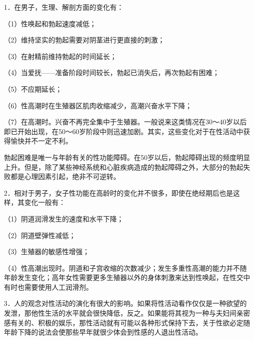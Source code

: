 \documentclass[12pt,UTF8,openany]{ctexbook}
\begin{document}
1．在男子，生理、解剖方面的变化有：

（1）性唤起和勃起速度减低；

（2）维持坚实的勃起需要对阴茎进行更直接的刺激；

（3）在射精前维持勃起的时间延长；

（4）当爱抚——准备阶段时间较长，勃起已消失后，再次勃起有困难；

（5）不应期延长；

（6）性高潮时在生殖器区肌肉收缩减少，高潮兴奋水平下降；

（7）在高潮时。兴奋不再完全集中于生殖器。一般说来这类情况在30～40岁以后即已开始出现，在50～60岁阶段中则迅速加剧。其实，这些变化对于在性活动中获得愉快并不一定不利。

勃起困难是唯一与年龄有关的性功能障碍。在50岁以后，勃起障碍出现的频度明显上升。但是，除了某些神经系统和心脏疾病造成的勃起障碍之外，大部分的勃起失败都是心理因素引起，绝非不可逆转。

2．相对于男子，女子性功能在高龄时的变化并不很多，即使在绝经期后也是这样，其变化一般有：

（1）阴道润滑发生的速度和水平下降；

（2）阴道壁弹性减低；

（3）生殖器的敏感性增强；

（4）性高潮出现时。阴道和子宫收缩的次数减少；发生多重性高潮的能力并不随年龄发生变化；高年女性需要更多生殖器以外的身体刺激来达到性唤起，在性交中有时也需要使用人工润滑剂。

3．人的观念对性活动的演化有很大的影响。如果将性活动看作仅仅是一种欲望的发泄，那他性生活的水平就会很快降低，反之。如果能将其视为一种与夫妇间亲密感有关的、积极的娱乐，那性活动就有可能以各种形式保持下去，关于性欲必定随年龄下降的说法会使那些早年就很少体会到性感的人退出性活动。
\end{document}

